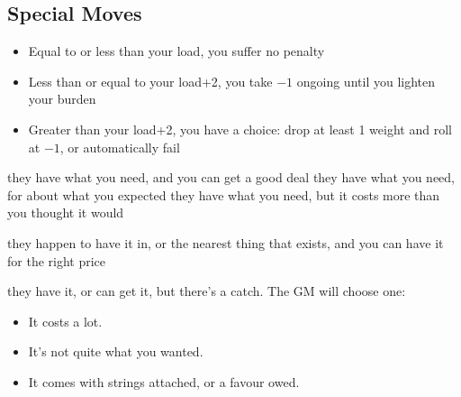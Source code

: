 \subsection{Special Moves}

\begin{itemize}
\item Equal to or less than your load, you suffer no penalty
\item Less than or equal to your load+2, you take $-1$ ongoing until you lighten your burden
\item Greater than your load+2, you have a choice: drop at least 1 weight and roll at $-1$, or automatically fail
\end{itemize}

{they have what you need, and you can get a good deal}
{they have what you need, for about what you expected}
{they have what you need, but it costs more than you thought it would}

{they happen to have it in, or the nearest thing that exists, and you can have it for the right price}
{they have it, or can get it, but there's a catch. The GM will choose one:
\begin{itemize}
\item It costs a lot.
\item It's not quite what you wanted.
\item It comes with strings attached, or a favour owed.
\end{itemize}}